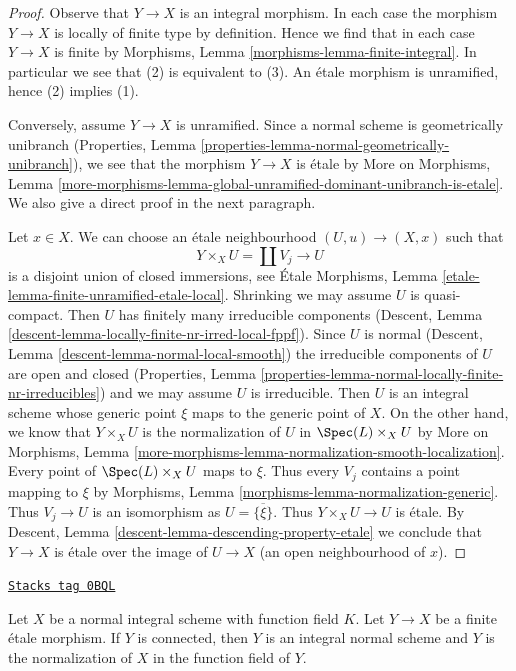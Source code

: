 \begin{proof}
Observe that $Y \to X$ is an integral morphism.
In each case the morphism $Y \to X$ is locally of finite type
by definition.
Hence we find that in each case $Y \to X$ is finite by
Morphisms, Lemma \ref{morphisms-lemma-finite-integral}.
In particular we see that (2) is equivalent to (3).
An \'etale morphism is unramified, hence (2) implies (1).

\medskip\noindent
Conversely, assume $Y \to X$ is unramified. Since a normal scheme is
geometrically unibranch
(Properties, Lemma \ref{properties-lemma-normal-geometrically-unibranch}),
we see that the morphism $Y \to X$ is \'etale by More on Morphisms, Lemma
\ref{more-morphisms-lemma-global-unramified-dominant-unibranch-is-etale}.
We also give a direct proof in the next paragraph.

\medskip\noindent
Let $x \in X$.
We can choose an \'etale neighbourhood $(U, u) \to (X, x)$ such that
$$
Y \times_X U = \coprod V_j \longrightarrow U
$$
is a disjoint union of closed immersions, see
\'Etale Morphisms, Lemma \ref{etale-lemma-finite-unramified-etale-local}.
Shrinking we may assume $U$ is quasi-compact.
Then $U$ has finitely many irreducible components
(Descent, Lemma \ref{descent-lemma-locally-finite-nr-irred-local-fppf}).
Since $U$ is normal
(Descent, Lemma \ref{descent-lemma-normal-local-smooth}) the
irreducible components of $U$ are open and closed
(Properties, Lemma \ref{properties-lemma-normal-locally-finite-nr-irreducibles})
and we may assume $U$ is irreducible. Then $U$ is an integral
scheme whose generic point $\xi$ maps to the generic point of $X$.
On the other hand, we know that $Y \times_X U$
is the normalization of $U$ in $\Spec(L) \times_X U$
by More on Morphisms, Lemma
\ref{more-morphisms-lemma-normalization-smooth-localization}.
Every point of $\Spec(L) \times_X U$ maps to $\xi$.
Thus every $V_j$ contains a point mapping to $\xi$ by
Morphisms, Lemma \ref{morphisms-lemma-normalization-generic}.
Thus $V_j \to U$ is an isomorphism as $U = \overline{\{\xi\}}$.
Thus $Y \times_X U \to U$ is \'etale. By
Descent, Lemma \ref{descent-lemma-descending-property-etale}
we conclude that $Y \to X$ is \'etale over the
image of $U \to X$ (an open neighbourhood of $x$).
\end{proof}

\begin{lemma}
\label{pione-lemma-finite-etale-covering-normal-unramified}
\href{https://stacks.math.columbia.edu/tag/0BQL}{\texttt{Stacks tag 0BQL}}

Let $X$ be a normal integral scheme with function field $K$.
Let $Y \to X$ be a finite \'etale morphism. If $Y$ is connected,
then $Y$ is an integral normal scheme and $Y$ is the normalization
of $X$ in the function field of $Y$.
\end{lemma}

